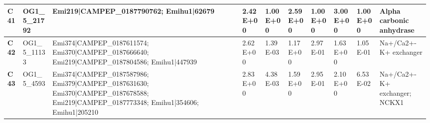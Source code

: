 \begin{landscape}
\begin{center}
\begin{footnotesize}
\begin{longtable}{|p{0.5cm}|p{1.5cm}|p{4cm}|l|l|l|l|l|l|l|}
\textbf{C41} & OG1\_5\_21792 & Emi219|CAMPEP\_0187790762; Emihu1|62679                                                                                                                                                                                                                                                                                                                                                                                                                                                                                                                                                                                                  & 2.42E+00  & 1.00E+00 & 2.59E+00  & 1.00E+00 & 3.00E+00  & 1.00E+00 & Alpha carbonic anhydrase                                                     \\ \hline
\textbf{C42} & OG1\_5\_11133 & Emi374|CAMPEP\_0187611574; Emi370|CAMPEP\_0187666640; Emi219|CAMPEP\_0187804586; Emihu1|447939                                                                                                                                                                                                                                                                                                                                                                                                                                                                                                                                           & 2.62E+00  & 1.39E-03 & 1.17E+00  & 2.97E-01 & 1.63E+00  & 1.05E-01 & Na+/Ca2+-K+ exchanger                                                        \\ \hline
\textbf{C43} & OG1\_5\_4593  & Emi374|CAMPEP\_0187587986; Emi379|CAMPEP\_0187631630; Emi370|CAMPEP\_0187678588; Emi219|CAMPEP\_0187773348; Emihu1|354606; Emihu1|205210                                                                                                                                                                                                                                                                                                                                                                                                                                                                                                 & 2.83E+00  & 4.38E-03 & 1.59E+00  & 2.95E-01 & 2.10E+00  & 6.53E-02 & Na+/Ca2+-K+ exchanger; NCKX1                                                 \\ \hline

\end{longtable}
\end{footnotesize}
\end{center}
\end{landscape}
